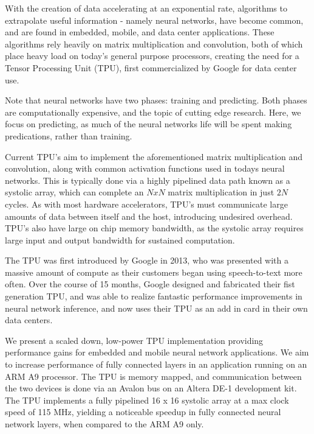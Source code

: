 \documentclass[11pt, conference, onecolumn]{IEEEtran}
\begin{document}
    With the creation of data accelerating at an exponential rate, algorithms to
    extrapolate useful information - namely neural networks, have become
    common, and are found in embedded, mobile, and data center applications. These
    algorithms rely heavily on matrix multiplication and convolution, both of which place
    heavy load on today's general purpose processors, creating the need for a Tensor
    Processing Unit (TPU), first commercialized by Google for data center use.

    Note that neural networks have two phases: training and predicting. Both phases are
    computationally expensive, and the topic of cutting edge research. Here, we focus
    on predicting, as much of the neural networks life will be spent making predications,
    rather than training.

    Current TPU's aim to implement the aforementioned matrix multiplication and
    convolution, along with common activation functions used in todays neural networks.
    This is typically done via a highly pipelined data path known as a systolic array,
    which can complete an $N x N$ matrix multiplication in just $2N$ cycles. As with most
    hardware accelerators, TPU's must communicate large amounts of data between itself and
    the host, introducing undesired overhead. TPU's also have large on chip memory
    bandwidth, as the systolic array requires large input and output bandwidth for sustained
    computation.

    The TPU was first introduced by Google in 2013, who was presented with a massive
    amount of compute as their customers began using speech-to-text more often. Over the
    course of 15 months, Google designed and fabricated their fist generation TPU, and
    was able to realize fantastic performance improvements in neural network inference,
    and now uses their TPU as an add in card in their own data centers.

    We present a scaled down, low-power TPU implementation providing performance gains for
    embedded and mobile neural network applications. We aim to increase performance of
    fully connected layers in an application running on an ARM A9 processor. The TPU is
    memory mapped, and communication between the two devices is done via an Avalon bus on
    an Altera DE-1 development kit. The TPU implements a fully pipelined 16 x 16 systolic
    array at a max clock speed of 115 MHz, yielding a noticeable speedup in
    fully connected neural network layers, when compared to the ARM A9 only.
\end{document}
